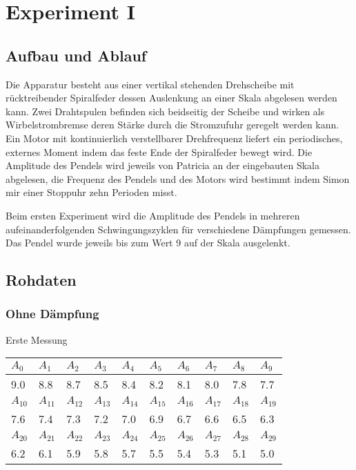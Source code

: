 \documentclass[12pt,a4paper]{article}
\begin{document}
\newpage

\section*{Experiment I}

\subsection*{Aufbau und Ablauf}
Die Apparatur besteht aus einer vertikal stehenden Drehscheibe mit r\"ucktreibender Spiralfeder dessen Auslenkung an einer Skala abgelesen werden kann. Zwei Drahtspulen befinden sich beidseitig der Scheibe und wirken als Wirbelstrombremse deren St\"arke durch die Stromzufuhr geregelt werden kann. Ein Motor mit kontinuierlich verstellbarer Drehfrequenz liefert ein periodisches, externes Moment indem das feste Ende der Spiralfeder bewegt wird. Die Amplitude des Pendels wird jeweils von Patricia an der eingebauten Skala abgelesen, die Frequenz des Pendels und des Motors wird bestimmt indem Simon mir einer Stoppuhr zehn Perioden misst.

Beim ersten Experiment wird die Amplitude des Pendels in mehreren aufeinanderfolgenden Schwingungszyklen für verschiedene Dämpfungen gemessen. Das Pendel wurde jeweils bis zum Wert 9 auf der Skala ausgelenkt.

\subsection*{Rohdaten}
\subsubsection*{Ohne D\"ampfung}
Erste Messung

\vspace{3pt}
\begin{tabular}{|l|l|l|l|l|l|l|l|l|l|}
\hline
$A_{0}$&$A_{1}$&$A_{2}$&$A_{3}$&$A_{4}$&$A_{5}$&$A_{6}$&$A_{7}$&$A_{8}$&$A_{9}$\\
\hline
9.0&8.8&8.7&8.5&8.4&8.2&8.1&8.0&7.8&7.7\\
\hline
\hline
$A_{10}$&$A_{11}$&$A_{12}$&$A_{13}$&$A_{14}$&$A_{15}$&$A_{16}$&$A_{17}$&$A_{18}$&$A_{19}$\\
\hline
7.6&7.4&7.3&7.2&7.0&6.9&6.7&6.6&6.5&6.3\\
\hline
\hline
$A_{20}$&$A_{21}$&$A_{22}$&$A_{23}$&$A_{24}$&$A_{25}$&$A_{26}$&$A_{27}$&$A_{28}$&$A_{29}$\\
\hline
6.2&6.1&5.9&5.8&5.7&5.5&5.4&5.3&5.1&5.0\\
\hline
\end{tabular}
\end{document}
